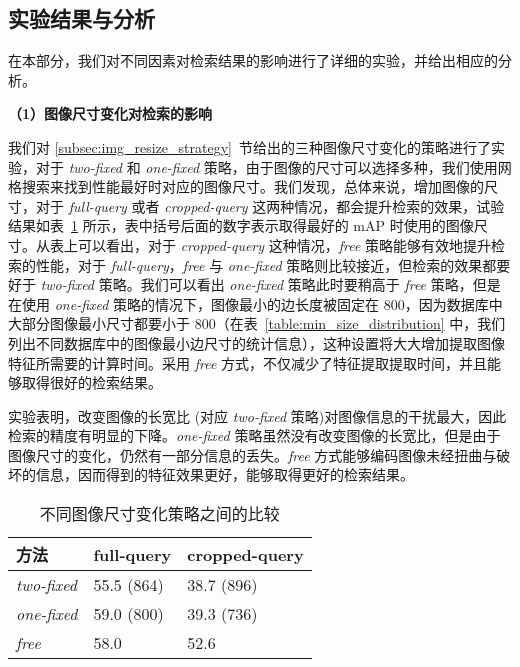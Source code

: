 \subsection{实验结果与分析}
在本部分，我们对不同因素对检索结果的影响进行了详细的实验，并给出相应的分析。

\noindent\textbf{（1）图像尺寸变化对检索的影响}

我们对 \ref{subsec:img_resize_strategy}~节给出的三种图像尺寸变化的策略进行了实验，对于 \emph{two-fixed} 和
\emph{one-fixed} 策略，由于图像的尺寸可以选择多种，我们使用网格搜索来找到性能最好时对应的图像尺寸。我们发现，总体来说，增加图像的尺寸，对于 \emph{full-query} 或者 \emph{cropped-query} 这两种情况，都会提升检索的效果，试验结果如表~\ref{table:image_size_impact} 所示，表中括号后面的数字表示取得最好的 mAP 时使用的图像尺寸。从表上可以看出，对于 \emph{cropped-query} 这种情况，\emph{free} 策略能够有效地提升检索的性能，对于 \emph{full-query}，\emph{free} 与 \emph{one-fixed} 策略则比较接近，但检索的效果都要好于 \emph{two-fixed} 策略。我们可以看出 \emph{one-fixed} 策略此时要稍高于 \emph{free} 策略，但是在使用 \emph{one-fixed} 策略的情况下，图像最小的边长度被固定在 800，因为数据库中大部分图像最小尺寸都要小于 800（在表~\ref{table:min_size_distribution} 中，我们列出不同数据库中的图像最小边尺寸的统计信息），这种设置将大大增加提取图像特征所需要的计算时间。采用 \emph{free} 方式，不仅减少了特征提取提取时间，并且能够取得很好的检索结果。

实验表明，改变图像的长宽比 (对应 \emph{two-fixed} 策略)对图像信息的干扰最大，因此检索的精度有明显的下降。\emph{one-fixed} 策略虽然没有改变图像的长宽比，但是由于图像尺寸的变化，仍然有一部分信息的丢失。\emph{free} 方式能够编码图像未经扭曲与破坏的信息，因而得到的特征效果更好，能够取得更好的检索结果。

\begin{table}[!t]
	\centering
	\caption{不同图像尺寸变化策略之间的比较}
	\label{table:image_size_impact}
	\begin{tabular}{lll}
		\toprule
		方法		    & full-query			& cropped-query \\
		\midrule
		\emph{two-fixed}		&		55.5 (864)		& 	38.7 (896)	\\
		\emph{one-fixed}		&		59.0 (800) 		&	39.3 (736)\\
		\emph{free}				&		58.0	 		&	52.6 	\\
		\bottomrule
	\end{tabular}
\end{table}

